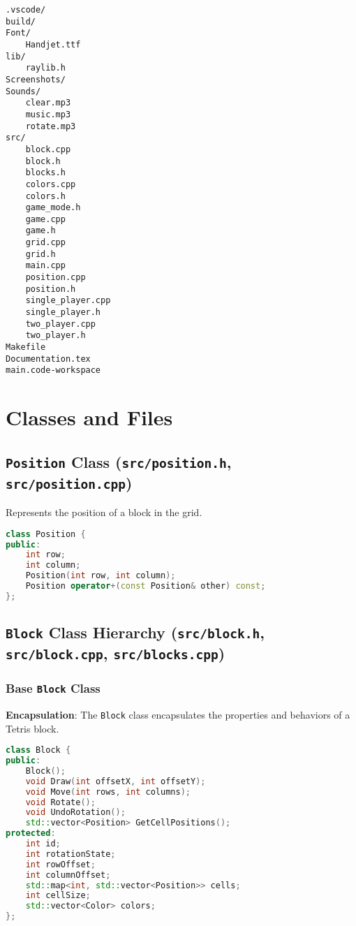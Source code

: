 \documentclass{article}
\begin{document}
\begin{verbatim}
.vscode/
build/
Font/
    Handjet.ttf
lib/
    raylib.h
Screenshots/
Sounds/
    clear.mp3
    music.mp3
    rotate.mp3
src/
    block.cpp
    block.h
    blocks.h
    colors.cpp
    colors.h
    game_mode.h
    game.cpp
    game.h
    grid.cpp
    grid.h
    main.cpp
    position.cpp
    position.h
    single_player.cpp
    single_player.h
    two_player.cpp
    two_player.h
Makefile
Documentation.tex
main.code-workspace
\end{verbatim}

\section{Classes and Files}

\subsection{\texttt{Position} Class (\texttt{src/position.h}, \texttt{src/position.cpp})}

Represents the position of a block in the grid.

\begin{lstlisting}[language=C++]
class Position {
public:
    int row;
    int column;
    Position(int row, int column);
    Position operator+(const Position& other) const;
};
\end{lstlisting}

\subsection{\texttt{Block} Class Hierarchy (\texttt{src/block.h}, \texttt{src/block.cpp}, \texttt{src/blocks.cpp})}
\subsubsection{Base \texttt{Block} Class}
\textbf{Encapsulation}: The \texttt{Block} class encapsulates the properties and behaviors of a Tetris block.

\begin{lstlisting}[language=C++]
class Block {
public:
    Block();
    void Draw(int offsetX, int offsetY);
    void Move(int rows, int columns);
    void Rotate();
    void UndoRotation();
    std::vector<Position> GetCellPositions();
protected:
    int id;
    int rotationState;
    int rowOffset;
    int columnOffset;
    std::map<int, std::vector<Position>> cells;
    int cellSize;
    std::vector<Color> colors;
};
\end{lstlisting}
\end{document}
